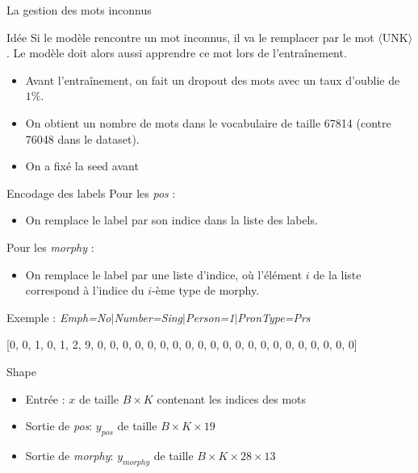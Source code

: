 \documentclass[11pt]{beamer}
\begin{document}
\begin{frame}{La gestion des mots inconnus}
    \begin{exampleblock}{Idée}
        Si le modèle rencontre un mot inconnus, il va le remplacer par le mot $\langle$UNK$\rangle$.
        Le modèle doit alors aussi apprendre ce mot lors de l'entraînement.
    \end{exampleblock}

    \begin{itemize}
        \item Avant l'entraînement, on fait un dropout des mots avec un taux d'oublie de $1\%$.
        \item On obtient un nombre de mots dans le vocabulaire de taille 67814 (contre 76048 dans le dataset).
        \item On a fixé la seed avant
    \end{itemize}
\end{frame}

\begin{frame}{Encodage des labels}
    Pour les \textit{pos} :
    \begin{itemize}
        \item On remplace le label par son indice dans la liste des labels.
    \end{itemize}
    Pour les \textit{morphy} :
    \begin{itemize}
        \item On remplace le label par une liste d'indice, où l'élément $i$ de la liste correspond à l'indice du $i$-ème type de morphy.
    \end{itemize}
    Exemple : \textit{Emph=No$\mid$Number=Sing$\mid$Person=1$\mid$PronType=Prs}

    [0, 0, 1, 0, 1, 2, 9, 0, 0, 0, 0, 0, 0, 0, 0, 0, 0, 0, 0, 0, 0, 0, 0, 0, 0, 0, 0, 0]

    \begin{exampleblock}{Shape}
        \begin{itemize}
            \item Entrée : $x$ de taille $B \times K$ contenant les indices des mots
            \item Sortie de \textit{pos}: $y_{pos}$ de taille $B \times K \times 19$
            \item Sortie de \textit{morphy}: $y_{morphy}$ de taille $B \times K \times 28 \times 13$
        \end{itemize}
    \end{exampleblock}
\end{frame}
\end{document}
